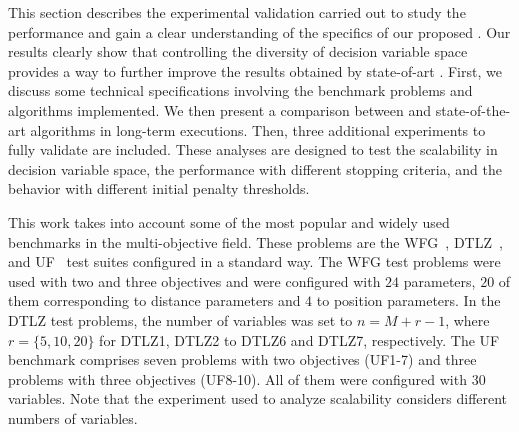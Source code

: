 This section describes the experimental validation carried out to study the performance and
gain a clear understanding of the specifics of our proposed \VSDMOEA{}.
%
Our results clearly show that controlling the diversity of decision variable space provides a way to further improve the results 
obtained by state-of-art \MOEAS{}.
%
First, we discuss some technical specifications involving the benchmark problems and algorithms implemented.
%
We then present a comparison between \VSDMOEA{} and state-of-the-art algorithms in long-term executions.
%
Then, three additional experiments to fully validate \VSDMOEA{} are included.
%
These analyses are designed to test the scalability in decision variable space, the performance with different stopping criteria, 
and the behavior with different initial penalty thresholds.

This work takes into account some of the most popular and widely used benchmarks in the multi-objective field.
%
These problems are the WFG~\citep{Joel:WFG}, DTLZ~\citep{Joel:DTLZ}, and UF~\citep{Joel:CEC2009} test suites 
configured in a standard way.
%
The WFG test problems were used with two and three objectives and 
were configured with $24$ parameters, $20$ of them corresponding to distance parameters and $4$ to position parameters.
%
In the DTLZ test problems, the number of variables was set to $n=M+r-1$, where $r=\{5, 10, 20\}$ for DTLZ1, DTLZ2 to DTLZ6 and DTLZ7, respectively.
% 
The UF benchmark comprises seven problems with two objectives (UF1-7) and three problems with three objectives (UF8-10).
%
All of them were configured with $30$ variables.
%
Note that the experiment used to analyze scalability considers different numbers of variables.

